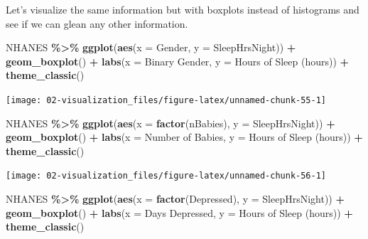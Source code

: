 \documentclass[
]{book}
\newenvironment{Shaded}{\begin{snugshade}}{\end{snugshade}}
\newcommand{\AttributeTok}[1]{\textcolor[rgb]{0.13,0.29,0.53}{#1}}
\newcommand{\FunctionTok}[1]{\textcolor[rgb]{0.13,0.29,0.53}{\textbf{#1}}}
\newcommand{\NormalTok}[1]{#1}
\newcommand{\SpecialCharTok}[1]{\textcolor[rgb]{0.81,0.36,0.00}{\textbf{#1}}}
\newcommand{\StringTok}[1]{\textcolor[rgb]{0.31,0.60,0.02}{#1}}
\begin{document}
Let's visualize the same information but with boxplots instead of histograms and see if we can glean any other information.

\begin{Shaded}
\begin{Highlighting}[]
\NormalTok{NHANES }\SpecialCharTok{\%\textgreater{}\%}
    \FunctionTok{ggplot}\NormalTok{(}\FunctionTok{aes}\NormalTok{(}\AttributeTok{x =}\NormalTok{ Gender, }\AttributeTok{y =}\NormalTok{ SleepHrsNight)) }\SpecialCharTok{+}
    \FunctionTok{geom\_boxplot}\NormalTok{() }\SpecialCharTok{+} 
    \FunctionTok{labs}\NormalTok{(}\AttributeTok{x =} \StringTok{\textquotesingle{}Binary Gender\textquotesingle{}}\NormalTok{, }\AttributeTok{y =} \StringTok{\textquotesingle{}Hours of Sleep (hours)\textquotesingle{}}\NormalTok{) }\SpecialCharTok{+} 
    \FunctionTok{theme\_classic}\NormalTok{() }
\end{Highlighting}
\end{Shaded}

\begin{center}\texttt{[image: 02-visualization\_files/figure-latex/unnamed-chunk-55-1]} \end{center}

\begin{Shaded}
\begin{Highlighting}[]
\NormalTok{NHANES }\SpecialCharTok{\%\textgreater{}\%}
    \FunctionTok{ggplot}\NormalTok{(}\FunctionTok{aes}\NormalTok{(}\AttributeTok{x =} \FunctionTok{factor}\NormalTok{(nBabies), }\AttributeTok{y =}\NormalTok{ SleepHrsNight)) }\SpecialCharTok{+}
    \FunctionTok{geom\_boxplot}\NormalTok{() }\SpecialCharTok{+} 
    \FunctionTok{labs}\NormalTok{(}\AttributeTok{x =} \StringTok{\textquotesingle{}Number of Babies\textquotesingle{}}\NormalTok{, }\AttributeTok{y =} \StringTok{\textquotesingle{}Hours of Sleep (hours)\textquotesingle{}}\NormalTok{) }\SpecialCharTok{+} 
    \FunctionTok{theme\_classic}\NormalTok{() }
\end{Highlighting}
\end{Shaded}

\begin{center}\texttt{[image: 02-visualization\_files/figure-latex/unnamed-chunk-56-1]} \end{center}

\begin{Shaded}
\begin{Highlighting}[]
\NormalTok{NHANES }\SpecialCharTok{\%\textgreater{}\%}
    \FunctionTok{ggplot}\NormalTok{(}\FunctionTok{aes}\NormalTok{(}\AttributeTok{x =} \FunctionTok{factor}\NormalTok{(Depressed), }\AttributeTok{y =}\NormalTok{ SleepHrsNight)) }\SpecialCharTok{+}
    \FunctionTok{geom\_boxplot}\NormalTok{() }\SpecialCharTok{+} 
    \FunctionTok{labs}\NormalTok{(}\AttributeTok{x =} \StringTok{\textquotesingle{}Days Depressed\textquotesingle{}}\NormalTok{, }\AttributeTok{y =} \StringTok{\textquotesingle{}Hours of Sleep (hours)\textquotesingle{}}\NormalTok{) }\SpecialCharTok{+} 
    \FunctionTok{theme\_classic}\NormalTok{() }
\end{Highlighting}
\end{Shaded}
\end{document}
